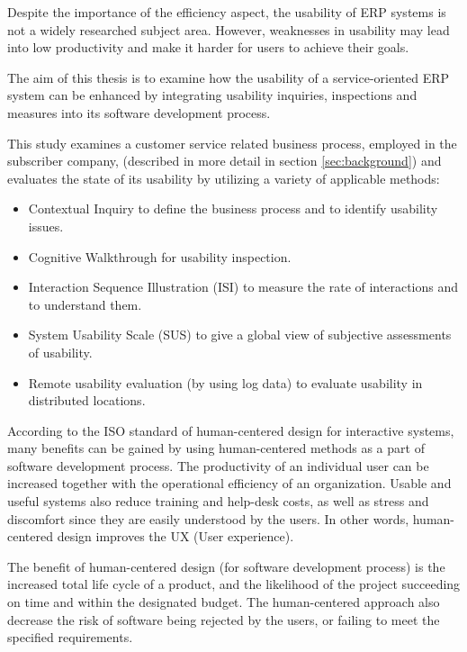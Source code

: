 \documentclass[12pt,a4paper,oneside,pdftex]{report}
\begin{document}
Despite the importance of the efficiency aspect, the usability of ERP systems is not a widely researched subject area. However, weaknesses in usability may lead into low productivity and make it harder for users to achieve their goals.\cite{RefWorks:2} 

The aim of this thesis is to examine how the usability of a service-oriented ERP system can be enhanced by integrating usability inquiries, inspections and measures into its software development process. 


This study examines a customer service related business process, employed in the subscriber company, (described in more detail in section \ref{sec:background}) and evaluates the state of its usability by utilizing a variety of applicable methods:
\begin{itemize}
\item Contextual Inquiry to define the business process and to identify usability issues.
\item Cognitive Walkthrough for usability inspection.
\item Interaction Sequence Illustration (ISI) to measure the rate of interactions and to understand them.
\item System Usability Scale (SUS) to give a global view of subjective assessments of usability.
\item Remote usability evaluation (by using log data) to evaluate usability in distributed locations.
\end{itemize}

\indent According to the ISO standard of human-centered design for interactive systems, many benefits can be gained by using human-centered methods as a part of software development process. The productivity of an individual user can be increased together with the operational efficiency of an organization. Usable and useful systems also reduce training and help-desk costs, as well as stress and discomfort since they are easily understood by the users. In other words, human-centered design improves the UX (User experience). \cite{RefWorks:16}

The benefit of human-centered design (for software development process) is the increased total life cycle of a product, and the likelihood of the project succeeding on time and within the designated budget. The human-centered approach also decrease the risk of software being rejected by the users, or failing to meet the specified requirements. \cite{RefWorks:16}
\end{document}
